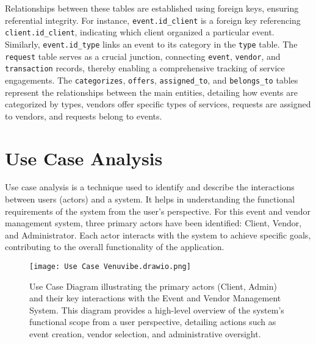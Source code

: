 \documentclass{report}
\begin{document}
Relationships between these tables are established using foreign keys, ensuring referential integrity. For instance, \texttt{event.id\_client} is a foreign key referencing \texttt{client.id\_client}, indicating which client organized a particular event. Similarly, \texttt{event.id\_type} links an event to its category in the \texttt{type} table. The \texttt{request} table serves as a crucial junction, connecting \texttt{event}, \texttt{vendor}, and \texttt{transaction} records, thereby enabling a comprehensive tracking of service engagements. The \texttt{categorizes}, \texttt{offers}, \texttt{assigned\_to}, and \texttt{belongs\_to} tables represent the relationships between the main entities, detailing how events are categorized by types, vendors offer specific types of services, requests are assigned to vendors, and requests belong to events.

\section{Use Case Analysis}
\label{sec:use_case_analysis}
Use case analysis is a technique used to identify and describe the interactions between users (actors) and a system. It helps in understanding the functional requirements of the system from the user's perspective. For this event and vendor management system, three primary actors have been identified: Client, Vendor, and Administrator. Each actor interacts with the system to achieve specific goals, contributing to the overall functionality of the application.

\begin{figure}[htbp]
    \centering
    \texttt{[image: Use Case Venuvibe.drawio.png]} %
    \caption{Use Case Diagram illustrating the primary actors (Client, Admin) and their key interactions with the Event and Vendor Management System. This diagram provides a high-level overview of the system's functional scope from a user perspective, detailing actions such as event creation, vendor selection, and administrative oversight.}
    \label{fig:use_case_diagram}
\end{figure}
\end{document}
